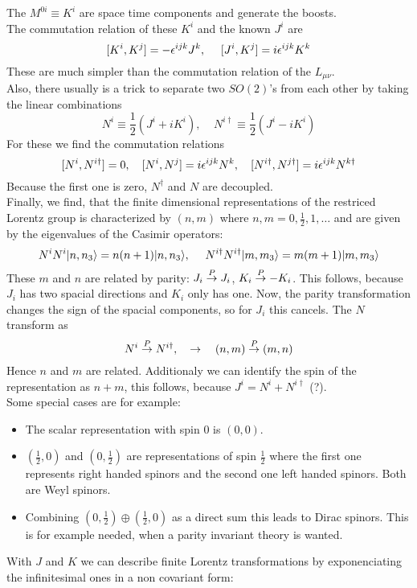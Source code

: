 The $M^{0i} \equiv K^i$ are space time components and generate the boosts.\\
The commutation relation of these $K^i$ and the known $J^i$ are
\[ [K^i, K^j] = - \epsilon^{ijk} J^k, ~~~~ [J^i, K^j] = i \epsilon^{ijk} K^k\]
These are much simpler than the commutation relation of the $L_{\mu\nu}$.\\
Also, there usually is a trick to separate two $SO(2)$'s from each other by taking the linear combinations
\[N^i \equiv \frac{1}{2}(J^i + i K^i), ~~~~~ N^{i\dagger} \equiv \frac{1}{2} ( J^i - i K^i)\]
For these we find the commutation relations
\[ [N^i, N^{i\dagger}] = 0, ~~~ [N^i, N^j] = i \epsilon^{ijk} N^k, ~~~ [N^{i\dagger}, N^{j\dagger}] = i \epsilon^{ijk} N^{k\dagger}\]
Because the first one is zero, $N^\dagger$ and $N$ are decoupled.\\
Finally, we find, that the finite dimensional representations of the restriced Lorentz group is characterized by $(n,m)$ where $n,m = 0,  \frac{1}{2}, 1, \ldots$ and are given by the eigenvalues of the Casimir operators:
\[N^iN^i|n,n_3\rangle = n(n+1)|n,n_3\rangle, ~~~~ N^{i\dagger}N^{i\dagger}|m,m_3\rangle = m(m+1)|m,m_3\rangle\]
These $m$ and $n$ are related by parity: $J_i \overset{P}{\rightarrow} J_i$, $K_i \overset{P}{\rightarrow} - K_i$. This follows, because $J_i$ has two spacial directions and $K_i$ only has one. Now, the parity transformation changes the sign of the spacial components, so for $J_i$ this cancels. The $N$ transform as
\[ N^i \overset{P}{\rightarrow} N^{i\dagger}, ~~~ \rightarrow ~~~ (n,m) \overset{P}{\rightarrow} (m,n)\]
Hence $n$ and $m$ are related. Additionaly we can identify the spin of the representation as $n+m$, this follows, because $J^i = N^i + N^{i\dagger}$ (?).\\
Some special cases are for example:
\begin{itemize}
\item The scalar representation with spin 0 is $(0,0)$.
\item $\left(\frac{1}{2}, 0\right)$ and $\left( 0, \frac{1}{2}\right)$ are representations of spin $\frac{1}{2}$ where the first one represents right handed spinors and the second one left handed spinors. Both are Weyl spinors.
\item Combining $\left(0, \frac{1}{2}\right)\oplus \left(\frac{1}{2}, 0 \right)$ as a direct sum this leads to Dirac spinors. This is for example needed, when a parity invariant theory is wanted.
\end{itemize}
With $J$ and $K$ we can describe finite Lorentz transformations by exponenciating the infinitesimal ones in a non covariant form:
